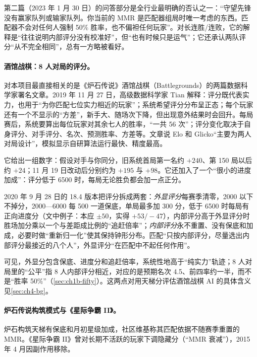 第二篇（2023 年 1 月 30 日）的问答部分是全行业最明确的否认之一：“守望先锋没有赢家队列或输家队列。你当前的 MMR 是匹配器组局时唯一考虑的东西。匹配器不会对任何人强制 50\% 胜率，也不偏袒任何玩家”\cite{blizzard2023overwatch}\tagOff。对长连胜/连败，它的解释是“往往说明内部评分没有校准好”，但“也有时候只是运气”\tagOff；它还承认两队评分“从不完全相同”，总有一方略被看好\tagOff。

\paragraph{酒馆战棋：8 人对局的评分。}
对本项目最直接相关的是《炉石传说》酒馆战棋（Battlegrounds）的两篇数据科学家署名文章。2019 年 11 月 27 日，高级数据科学家 Tian 解释：评分既代表实力，也用于“为你匹配七位实力相近的玩家”；系统希望评分分布呈正态；每个玩家还有一个不显示的“方差”，新手大、随场次下降，但出现意外结果时会回升\cite{blizzard2019developer}\tagOff。每局赛后，系统要算出每位玩家对其余七人的胜率，“一共 56 次”；评分变化取决于自身评分、对手评分、名次、预测胜率、方差等\tagOff。文章说 Elo 和 Glicko“主要为两人对局设计”，模拟显示自研算法运行最快、精度最高\tagOff。

它给出一组数字：假设对手与你同分，旧系统首局第一名约 $+240$、第 150 局以后约 $+24$；11 月 19 日改动后分别约为 $+195$ 与 $+98$\tagOff。它还加入了一个“很小的进度加成”：评分低于 6500 时，每局无论胜负都会加一点正分\tagOff。

2020 年 9 月 28 日的 18.4 版本把评分拆成两套\cite{blizzard2020developer}：\emph{外显评分}每赛季清零，2000 以下不掉分，2000—6000 每 500 一道保底，单局最多加 300 分，低于 6500 时每局有正向进度分（文中例子：本应 $\pm50$，实得 $+53/-47$），内部评分高于外显评分时胜场加分乘以一个与差距成比例的“追赶倍率”；\emph{内部评分}永不重置、没有保底和加成，必要时做“重新归一化”使其保持钟形分布\tagOff。匹配“只按内部评分，尽量选出内部评分最接近的八个人”，外显评分“在匹配中不起任何作用”\tagOff。

可见，外显分包含保底、进度分和追赶倍率，系统性地高于“纯实力”轨迹；8 人对局里的“公平”指 8 人内部评分相近，对应的是预期名次 4.5、前四率约一半，而不是“胜率 50\%”（\cref{sec:ch1b-fifty}）。这两点对用天梯分评估酒馆战棋 AI 的具体含义见\cref{sec:ch4-bg}。

\paragraph{炉石传说构筑模式与《星际争霸 II》。}
炉石构筑天梯有保底和月初星级加成，社区维基称其匹配依据不随赛季重置的 MMR\cite{hswiki2026ranked}\tagCom{}。《星际争霸 II》曾对长期不活跃的玩家下调隐藏分（“MMR 衰减”），2015 年 4 月因副作用移除\cite{blizzard2015sc2ladder}\tagOff。

